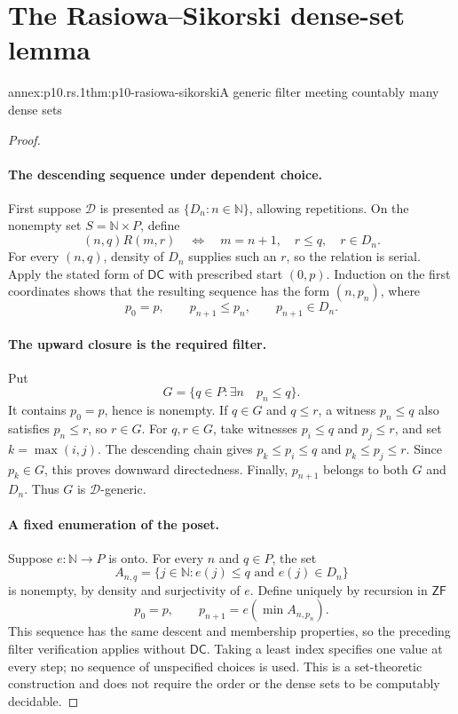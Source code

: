 
\section{The Rasiowa--Sikorski dense-set lemma}

\begin{annexitem}{annex:p10.rs.1}{thm:p10-rasiowa-sikorski}{A generic filter meeting countably many dense sets}
\begin{proof}
\paragraph{The descending sequence under dependent choice.}
First suppose \(\mathcal D\) is presented as
\(\{D_n:n\in\mathbb N\}\), allowing repetitions.
On the nonempty set \(S=\mathbb N\times P\), define
\[
 (n,q)R(m,r)
 \quad\Longleftrightarrow\quad
 m=n+1,\quad r\leq q,\quad r\in D_n.
\]
For every \((n,q)\), density of \(D_n\) supplies such an \(r\),
so the relation is serial.
Apply the stated form of \(\mathsf{DC}\) with prescribed start
\((0,p)\).
Induction on the first coordinates shows that the resulting sequence
has the form \((n,p_n)\), where
\[
 p_0=p,\qquad p_{n+1}\leq p_n,\qquad p_{n+1}\in D_n.
\]

\paragraph{The upward closure is the required filter.}
Put
\[
 G=\{q\in P:\exists n\quad p_n\leq q\}.
\]
It contains \(p_0=p\), hence is nonempty.
If \(q\in G\) and \(q\leq r\), a witness \(p_n\leq q\)
also satisfies \(p_n\leq r\), so \(r\in G\).
For \(q,r\in G\), take witnesses \(p_i\leq q\) and
\(p_j\leq r\), and set \(k=\max(i,j)\).
The descending chain gives
\(p_k\leq p_i\leq q\) and \(p_k\leq p_j\leq r\).
Since \(p_k\in G\), this proves downward directedness.
Finally, \(p_{n+1}\) belongs to both \(G\) and \(D_n\).
Thus \(G\) is \(\mathcal D\)-generic.

\paragraph{A fixed enumeration of the poset.}
Suppose \(e:\mathbb N\to P\) is onto.
For every \(n\) and \(q\in P\), the set
\[
 A_{n,q}=\{j\in\mathbb N:e(j)\leq q\text{ and }e(j)\in D_n\}
\]
is nonempty, by density and surjectivity of \(e\).
Define uniquely by recursion in \(\mathsf{ZF}\)
\[
 p_0=p,\qquad p_{n+1}=e(\min A_{n,p_n}).
\]
This sequence has the same descent and membership properties, so
the preceding filter verification applies without \(\mathsf{DC}\).
Taking a least index specifies one value at every step; no sequence
of unspecified choices is used.  This is a set-theoretic construction
and does not require the order or the dense sets to be computably
decidable.


\end{proof}
\end{annexitem}
